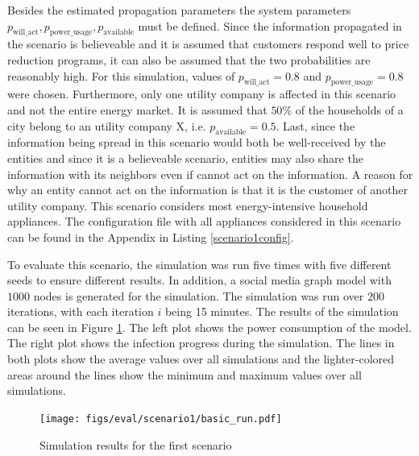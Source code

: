 Besides the estimated propagation parameters
the system parameters $p_{\mathrm{will\_act}}, p_{\mathrm{power\_usage}},
p_{\mathrm{available}}$ must be defined. Since the information 
propagated in the scenario
is believeable and it is assumed that customers respond well to price 
reduction programs, it can also be assumed that the two probabilities are 
reasonably high. For this simulation, values of $p_{\mathrm{will\_act}}=0.8$ and 
$p_{\mathrm{power\_usage}}=0.8$ were chosen. Furthermore, 
only one utility company is affected in this scenario and not the entire 
energy market. It is assumed that $50\%$ of the households of a city belong
to an utility company X, i.e. $p_{\mathrm{available}}=0.5$.
Last, since the information being spread in this scenario would both be 
well-received by the entities and since it is a believeable scenario, 
entities may also share the information with its neighbors even if
cannot act on the information. A reason for why an entity cannot act 
on the information is that it is the customer of another utility company.
This scenario considers most energy-intensive household appliances.
The configuration file with all appliances considered in this
scenario can be found in the Appendix in Listing \ref{scenario1config}.

To evaluate this scenario, the simulation was run five times with five 
different seeds to ensure
different results. In addition, a social media
graph model with $1000$ nodes is generated for the simulation. 
The simulation was run over $200$ iterations, with each
iteration $i$ being 15 minutes.
The results of the simulation can be seen in Figure \ref{firstscenariobasicresult}.
The left plot shows the power consumption of the model. The right 
plot shows the infection progress during the simulation.
The lines in both plots show the average values over all simulations and 
the lighter-colored areas around the lines show the minimum and maximum values
over all simulations. 


\begin{figure}[!ht]
    \center
    \texttt{[image: figs/eval/scenario1/basic\_run.pdf]}
    \caption{Simulation results for the first scenario}
    \label{firstscenariobasicresult}
\end{figure}

